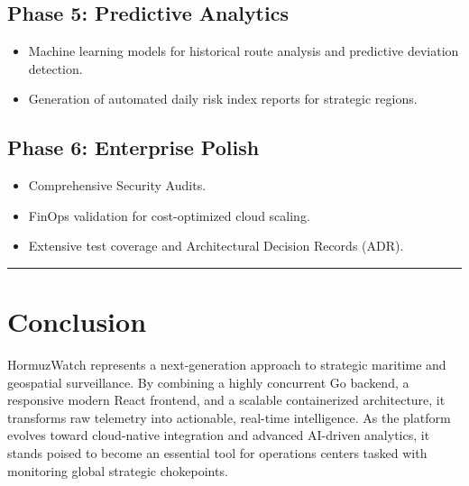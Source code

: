 \documentclass[11pt,a4paper]{article}
\begin{document}
\subsection{Phase 5: Predictive Analytics}
\begin{itemize}
    \item Machine learning models for historical route analysis and predictive deviation detection.
    \item Generation of automated daily risk index reports for strategic regions.
\end{itemize}

\subsection{Phase 6: Enterprise Polish}
\begin{itemize}
    \item Comprehensive Security Audits.
    \item FinOps validation for cost-optimized cloud scaling.
    \item Extensive test coverage and Architectural Decision Records (ADR).
\end{itemize}

\noindent\textcolor{textsecondary}{\rule{\textwidth}{0.5pt}}

\section{Conclusion}
HormuzWatch represents a next-generation approach to strategic maritime and geospatial surveillance. By combining a highly concurrent Go backend, a responsive modern React frontend, and a scalable containerized architecture, it transforms raw telemetry into actionable, real-time intelligence. As the platform evolves toward cloud-native integration and advanced AI-driven analytics, it stands poised to become an essential tool for operations centers tasked with monitoring global strategic chokepoints.
\end{document}
